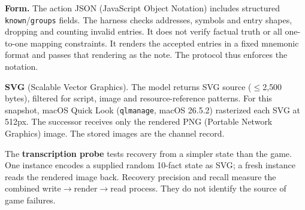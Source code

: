 \textbf{Form.} The action JSON (JavaScript Object Notation) includes structured \texttt{known}/\texttt{groups} fields. The harness checks addresses, symbols and entry shapes, dropping and counting invalid entries. It does not verify factual truth or all one-to-one mapping constraints. It renders the accepted entries in a fixed mnemonic format and passes that rendering as the note. The protocol thus enforces the notation.

\textbf{SVG} (Scalable Vector Graphics). The model returns SVG source ($\leq$2{,}500 bytes), filtered for script, image and resource-reference patterns. For this snapshot, macOS Quick Look (\texttt{qlmanage}, macOS 26.5.2) rasterized each SVG at 512px. The successor receives only the rendered PNG (Portable Network Graphics) image. The stored images are the channel record.

The \textbf{transcription probe} tests recovery from a simpler state than the game. One instance encodes a supplied random 10-fact state as SVG; a fresh instance reads the rendered image back. Recovery precision and recall measure the combined write$\to$render$\to$read process. They do not identify the source of game failures.
